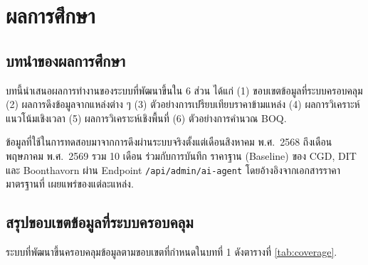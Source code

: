 \chapter{ผลการศึกษา}
\label{ch:results}

\section{บทนำของผลการศึกษา}

บทนี้นำเสนอผลการทำงานของระบบที่พัฒนาขึ้นใน 6 ส่วน ได้แก่
(1) ขอบเขตข้อมูลที่ระบบครอบคลุม
(2) ผลการดึงข้อมูลจากแหล่งต่าง ๆ
(3) ตัวอย่างการเปรียบเทียบราคาข้ามแหล่ง
(4) ผลการวิเคราะห์แนวโน้มเชิงเวลา
(5) ผลการวิเคราะห์เชิงพื้นที่
(6) ตัวอย่างการคำนวณ BOQ.

ข้อมูลที่ใช้ในการทดสอบมาจากการดึงผ่านระบบจริงตั้งแต่เดือนสิงหาคม
พ.ศ.\ 2568 ถึงเดือนพฤษภาคม พ.ศ.\ 2569 รวม 10 เดือน ร่วมกับการบันทึก
ราคาฐาน (Baseline) ของ CGD, DIT และ Boonthavorn ผ่าน Endpoint
\texttt{/api/admin/ai-agent} โดยอ้างอิงจากเอกสารราคามาตรฐานที่
เผยแพร่ของแต่ละแหล่ง.

\section{สรุปขอบเขตข้อมูลที่ระบบครอบคลุม}
\label{sec:coverage}

ระบบที่พัฒนาขึ้นครอบคลุมข้อมูลตามขอบเขตที่กำหนดในบทที่ 1
ดังตารางที่ \ref{tab:coverage}.

